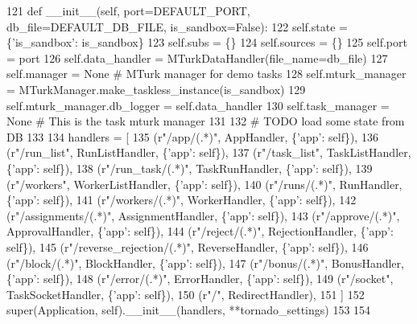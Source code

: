 \begin{DoxyCode}
121     \textcolor{keyword}{def }\_\_init\_\_(self, port=DEFAULT\_PORT, db\_file=DEFAULT\_DB\_FILE, is\_sandbox=False):
122         self.state = \{\textcolor{stringliteral}{'is\_sandbox'}: is\_sandbox\}
123         self.subs = \{\}
124         self.sources = \{\}
125         self.port = port
126         self.data\_handler = MTurkDataHandler(file\_name=db\_file)
127         self.manager = \textcolor{keywordtype}{None}  \textcolor{comment}{# MTurk manager for demo tasks}
128         self.mturk\_manager = MTurkManager.make\_taskless\_instance(is\_sandbox)
129         self.mturk\_manager.db\_logger = self.data\_handler
130         self.task\_manager = \textcolor{keywordtype}{None}  \textcolor{comment}{# This is the task mturk manager}
131 
132         \textcolor{comment}{# TODO load some state from DB}
133 
134         handlers = [
135             (\textcolor{stringliteral}{r"/app/(.*)"}, AppHandler, \{\textcolor{stringliteral}{'app'}: self\}),
136             (\textcolor{stringliteral}{r"/run\_list"}, RunListHandler, \{\textcolor{stringliteral}{'app'}: self\}),
137             (\textcolor{stringliteral}{r"/task\_list"}, TaskListHandler, \{\textcolor{stringliteral}{'app'}: self\}),
138             (\textcolor{stringliteral}{r"/run\_task/(.*)"}, TaskRunHandler, \{\textcolor{stringliteral}{'app'}: self\}),
139             (\textcolor{stringliteral}{r"/workers"}, WorkerListHandler, \{\textcolor{stringliteral}{'app'}: self\}),
140             (\textcolor{stringliteral}{r"/runs/(.*)"}, RunHandler, \{\textcolor{stringliteral}{'app'}: self\}),
141             (\textcolor{stringliteral}{r"/workers/(.*)"}, WorkerHandler, \{\textcolor{stringliteral}{'app'}: self\}),
142             (\textcolor{stringliteral}{r"/assignments/(.*)"}, AssignmentHandler, \{\textcolor{stringliteral}{'app'}: self\}),
143             (\textcolor{stringliteral}{r"/approve/(.*)"}, ApprovalHandler, \{\textcolor{stringliteral}{'app'}: self\}),
144             (\textcolor{stringliteral}{r"/reject/(.*)"}, RejectionHandler, \{\textcolor{stringliteral}{'app'}: self\}),
145             (\textcolor{stringliteral}{r"/reverse\_rejection/(.*)"}, ReverseHandler, \{\textcolor{stringliteral}{'app'}: self\}),
146             (\textcolor{stringliteral}{r"/block/(.*)"}, BlockHandler, \{\textcolor{stringliteral}{'app'}: self\}),
147             (\textcolor{stringliteral}{r"/bonus/(.*)"}, BonusHandler, \{\textcolor{stringliteral}{'app'}: self\}),
148             (\textcolor{stringliteral}{r"/error/(.*)"}, ErrorHandler, \{\textcolor{stringliteral}{'app'}: self\}),
149             (\textcolor{stringliteral}{r"/socket"}, TaskSocketHandler, \{\textcolor{stringliteral}{'app'}: self\}),
150             (\textcolor{stringliteral}{r"/"}, RedirectHandler),
151         ]
152         super(Application, self).\_\_init\_\_(handlers, **tornado\_settings)
153 
154 
\end{DoxyCode}


